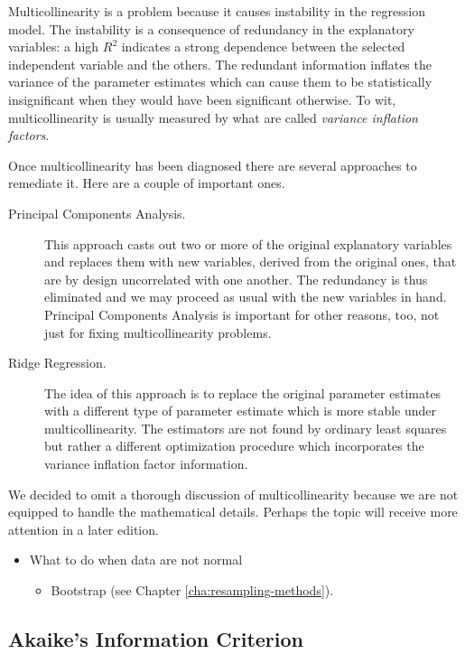 \documentclass[captions=tableheading]{scrbook}
\begin{document}
Multicollinearity is a problem because it causes instability in the regression model. The instability is a consequence of redundancy in the explanatory variables: a high \(R^{2}\) indicates a strong dependence between the selected independent variable and the others. The redundant information inflates the variance of the parameter estimates which can cause them to be statistically insignificant when they would have been significant otherwise. To wit, multicollinearity is usually measured by what are called \emph{variance inflation factors}.

Once multicollinearity has been diagnosed there are several approaches to remediate it. Here are a couple of important ones. 
\begin{description}
\item[Principal Components Analysis.] This approach casts out two or more of the original explanatory variables and replaces them with new variables, derived from the original ones, that are by design uncorrelated with one another. The redundancy is thus eliminated and we may proceed as usual with the new variables in hand. Principal Components Analysis is important for other reasons, too, not just for fixing multicollinearity problems.
\item[Ridge Regression.] The idea of this approach is to replace the original parameter estimates with a different type of parameter estimate which is more stable under multicollinearity. The estimators are not found by ordinary least squares but rather a different optimization procedure which incorporates the variance inflation factor information.
\end{description}

We decided to omit a thorough discussion of multicollinearity because we are not equipped to handle the mathematical details. Perhaps the topic will receive more attention in a later edition.

\begin{itemize}
\item What to do when data are not normal
\begin{itemize}
\item Bootstrap (see Chapter \ref{cha:resampling-methods}).
\end{itemize}
\end{itemize}
\subsection{Akaike's Information Criterion}
\label{sec-12-9-4}
\end{document}
